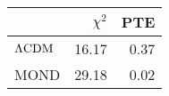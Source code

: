 \begin{tabular}{lrr}
\toprule
{} &  $\chi^2$ &  PTE \\
\midrule
$\Lambda \rm CDM$ &     16.17 & 0.37 \\
MOND              &     29.18 & 0.02 \\
\bottomrule
\end{tabular}
